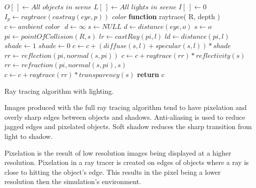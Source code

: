 \begin{algorithm}[H]
\begin{algorithmic}[1]
\STATE $O[\ ] \gets \textit{All objects in scene}$ 
\STATE $L[\ ] \gets \textit{All lights in scene}$
\STATE $I[\ ] \gets 0$ 
\STATE
{}
	\STATE $I_{p} \gets raytrace( castray( eye, p ))$
\ENDFOR
\STATE 
\STATE \textit{color} \textbf{function} raytrace(  R, depth )
	\STATE $c  \gets \textit{ambient color } $
	\STATE $d \gets \infty $
	\STATE $s \gets \textit{NULL}$
				\STATE $d \gets distance( \textit{eye}, o )$
				\STATE $s \gets o$
			\ENDIF
		\ENDIF
	\ENDFOR
		\STATE {}
		\STATE $pi \gets pointOfCollision( R, s )$
			\STATE $lr \gets castRay( pi, l )$
			\STATE $ld \gets distance( pi, l )$
			\STATE $shade \gets 1$
					\STATE $shade \gets 0$				
				\ENDIF
				\STATE $c \gets c +( diffuse( s, l ) + specular( s, l )) * shade$ 
			\ENDFOR
		\ENDFOR
		\STATE {}
			\STATE $rr \gets reflection( pi, normal( s, pi ))$
			\STATE $c \gets c + raytrace( rr ) * reflectivity( s )$
		\ENDIF
		\STATE {}
			\STATE $rr \gets refraction( pi, normal( s, pi ), s )$
			\STATE $c \gets c + raytrace( rr ) * transparency( s )$
		\ENDIF
	\ENDIF
	\STATE \textbf{return} c

\end{algorithmic}
\caption{ Ray tracing algorithm with lighting. }
\label{ray-trace-full}
\end{algorithm}
\newpage

Images produced with the full ray tracing algorithm tend to have pixelation and overly sharp edges between objects and shadows.  Anti-aliasing is used to reduce jagged edges and pixelated objects. Soft shadow reduces the sharp transition from light to shadow.

Pixelation is the result of low resolution images being displayed at a higher resolution.  Pixelation in a ray tracer is created on edges of objects where a ray is close to hitting the object's edge.  This results in the pixel being a lower resolution then the simulation's environment.

